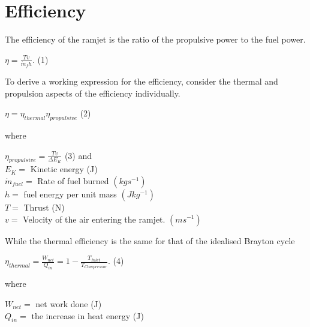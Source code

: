 \documentclass[12pt,onecolumn]{IEEEtran}
\begin{document}
\section{Efficiency}
\begin{flushleft}
The efficiency of the ramjet is the ratio of the propulsive power to the fuel power.\cite{greitzer_spakovsky_waitz}\\
\begin{center}
$ \eta = \frac{Tv}{\dot{m}_f h}.$ (1)
\end{center}
To derive a working expression for the efficiency, consider the thermal and propulsion aspects of the efficiency individually.\\
\begin{center}
$ \eta = \eta_{thermal} \eta_{propulsive}$ (2)
\end{center}
where\\
\begin{center}
$\eta_{propulsive}=\frac{Tv}{\Delta E_K} $ (3)
\vspace{1mm}
and\\
\vspace{2mm}
$
E_K = $ Kinetic energy (J)\\
\vspace{1mm}
$\dot{m}_{fuel} = $ Rate of fuel burned $(kgs^{-1})$\\
\vspace{1mm}
$h = $ fuel energy per unit mass $(Jkg^{-1})$\\
\vspace{1mm}
$T = $ Thrust (N)\\
\vspace{1mm}
$v = $ Velocity of the air entering the ramjet. $(ms^{-1})$\\
\end{center}
While the thermal efficiency is the same for that of the idealised Brayton cycle\\
\vspace{1mm}
\begin{center}
$\eta_{thermal}=\frac{W_{net}}{Q_{in}}=1-\frac{T_{Inlet}}{T_{Compressor}}$. (4)\\
\vspace{2mm}
\end{center}
where\\
\begin{center}
$W_{net} = $ net work done (J)\\
\vspace{1mm}
$Q_{in} = $ the increase in heat energy (J)\\

\end{center}
\end{flushleft}
\end{document}
